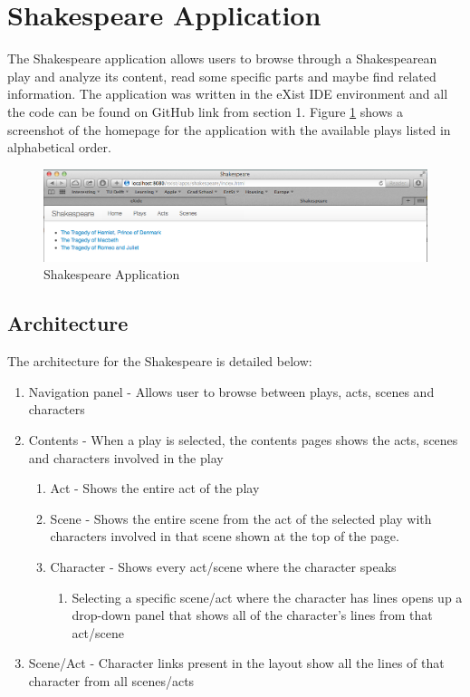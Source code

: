 \documentclass[Shakespeare.tex]{subfiles}
\begin{document}
\section{Shakespeare Application}

The Shakespeare application allows users to browse through a Shakespearean play and analyze its content, read some specific parts and maybe find related information. The application was written in the eXist IDE environment and all the code can be found on GitHub link from section 1. Figure \ref{fig:shakespearemain} shows a screenshot of the homepage for the application with the available plays listed in alphabetical order.

\begin{figure} [H]
	\centering
	\includegraphics[width=1\textwidth]{./Figures/ShakespeareMain.png}
	\caption{Shakespeare Application}
	\label{fig:shakespearemain}
\end{figure}

\subsection{Architecture}
The architecture for the Shakespeare is detailed below:

\begin{enumerate}
	\item Navigation panel - Allows user to browse between plays, acts, scenes and characters
	\item Contents - When a play is selected, the contents pages shows the acts, scenes and characters involved in the play
		\begin{enumerate}
			\item Act - Shows the entire act of the play
			\item Scene - Shows the entire scene from the act of the selected play with characters involved in that scene shown at the top of the page.
			\item Character - Shows every act/scene where the character speaks
			\begin{enumerate}
				\item Selecting a specific scene/act where the character has lines opens up a drop-down panel that shows all of the character's lines from that act/scene
			\end{enumerate}
		\end{enumerate}	
	\item Scene/Act - Character links present in the layout show all the lines of that character from all scenes/acts
\end{enumerate}
\end{document}
